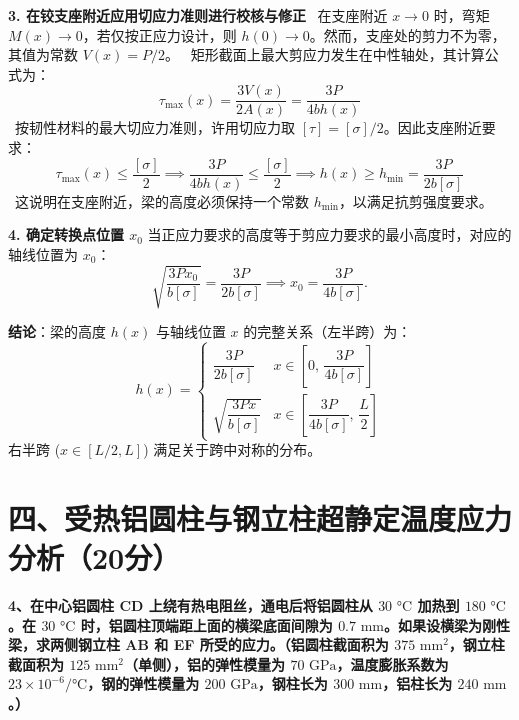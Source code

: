 \documentclass[11pt,a4paper]{ctexrep}
\begin{document}
{\textbf{3. 在铰支座附近应用切应力准则进行校核与修正}
\noindent\textbullet\ 在支座附近 $x \to 0$ 时，弯矩 $M(x) \to 0$，若仅按正应力设计，则 $h(0) \to 0$。然而，支座处的剪力不为零，其值为常数 $V(x) = P/2$。
\noindent\textbullet\ 矩形截面上最大剪应力发生在中性轴处，其计算公式为：
    \[
        \tau_{\max}(x) = \frac{3 V(x)}{2 A(x)} = \frac{3 P}{4 b h(x)}
    \]
\noindent\textbullet\ 按韧性材料的最大切应力准则，许用切应力取 $[\tau]=[\sigma]/2$。因此支座附近要求：
    \[
        \tau_{\max}(x) \le \frac{[\sigma]}{2}
        \implies
        \frac{3 P}{4 b h(x)} \le \frac{[\sigma]}{2}
        \implies
        h(x) \ge h_{\min} = \frac{3 P}{2 b [\sigma]}
    \]
\noindent\textbullet\ 这说明在支座附近，梁的高度必须保持一个常数 $h_{\min}$，以满足抗剪强度要求。

\textbf{4. 确定转换点位置 $x_0$}
当正应力要求的高度等于剪应力要求的最小高度时，对应的轴线位置为 $x_0$：
\[
    \sqrt{\frac{3 P x_0}{b [\sigma]}}
    =
    \frac{3 P}{2 b [\sigma]}
    \implies
    x_0 = \frac{3P}{4b[\sigma]}.
\]

\textbf{结论}：梁的高度 $h(x)$ 与轴线位置 $x$ 的完整关系（左半跨）为：
\[
    h(x) = \begin{cases}
        \dfrac{3 P}{2 b [\sigma]} & x \in \left[ 0, \, \dfrac{3P}{4b[\sigma]} \right] \\[10pt]
        \sqrt{\dfrac{3 P x}{b [\sigma]}} & x \in \left[ \dfrac{3P}{4b[\sigma]}, \, \dfrac{L}{2} \right]
    \end{cases}
\]
右半跨 ($x \in [L/2, L]$) 满足关于跨中对称的分布。




\section*{四、受热铝圆柱与钢立柱超静定温度应力分析（20分）}

\textbf{4、在中心铝圆柱 CD 上绕有热电阻丝，通电后将铝圆柱从 $30\text{ °C}$ 加热到 $180\text{ °C}$。在 $30\text{ °C}$ 时，铝圆柱顶端距上面的横梁底面间隙为 $0.7\text{ mm}$。如果设横梁为刚性梁，求两侧钢立柱 AB 和 EF 所受的应力。（铝圆柱截面积为 $375\text{ mm}^2$，钢立柱截面积为 $125\text{ mm}^2$（单侧），铝的弹性模量为 $70\text{ GPa}$，温度膨胀系数为 $23 \times 10^{-6}/\text{°C}$，钢的弹性模量为 $200\text{ GPa}$，钢柱长为 $300\text{ mm}$，铝柱长为 $240\text{ mm}$。）}

\begin{center}
\end{center}}
\end{document}
